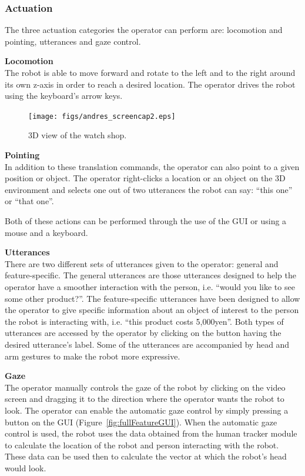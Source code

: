 \documentclass[journal]{IEEEtran}
\begin{document}
\subsubsection{Actuation}
The three actuation categories the operator can perform are: locomotion and pointing, utterances and gaze control.

{\bf Locomotion}\\
The robot is able to move forward and rotate to the left and to the right around its own z-axis in order to reach a desired location.
The operator drives the robot using the keyboard's arrow keys.

\begin{figure}[htp]
\centering
\texttt{[image: figs/andres\_screencap2.eps]}
\caption{3D view of the watch shop.}
\label{fig:simShop}
\end{figure}

{\bf Pointing}\\
In addition to these translation commands, the operator can also point to a given position or object.
The operator right-clicks a location or an object on the 3D environment and selects one out of two utterances the robot can say: ``this one'' or ``that one''.

Both of these actions can be performed through the use of the GUI or using a mouse and a keyboard.

{\bf Utterances}\\
There are two different sets of utterances given to the operator: general and feature-specific.
The general utterances are those utterances designed to help the operator have a smoother interaction with the person, i.e. ``would you like to see some other product?''.
The feature-specific utterances have been designed to allow the operator to give specific information about an object of interest to the person the robot is interacting with, i.e. ``this product costs 5,000yen''.
Both types of utterances are accessed by the operator by clicking on the button having the desired utterance's label.
Some of the utterances are accompanied by head and arm gestures to make the robot more expressive.

{\bf Gaze}\\
The operator manually controls the gaze of the robot by clicking on the video screen and dragging it to the direction where the operator wants the robot to look.
The operator can enable the automatic gaze control by simply pressing a button on the GUI (Figure~\ref{fig:fullFeatureGUI}).
When the automatic gaze control is used, the robot uses the data obtained from the human tracker module to calculate the location of the robot and person interacting with the robot.
These data can be used then to calculate the vector at which the robot's head would look.
\end{document}
